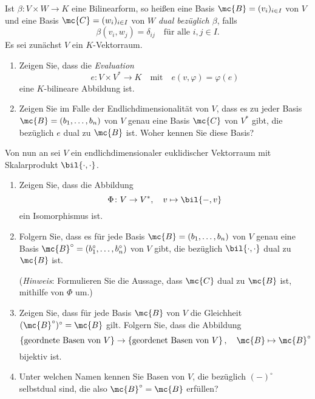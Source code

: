 \begin{question}
  Ist $\beta \colon V \times W \to K$ eine Bilinearform, so heißen eine Basis $\mc{B} = (v_i)_{i \in I}$ von $V$ und eine Basis $\mc{C} = (w_i)_{i \in I}$ von $W$ \emph{dual bezüglich $\beta$}, falls
  \[
    \beta(v_i, w_j) = \delta_{ij}
    \quad
    \text{für alle $i, j \in I$}.
  \]
  Es sei zunächst $V$ ein $K$-Vektorraum.
  \begin{enumerate}
    \item
      Zeigen Sie, dass die \emph{Evaluation}
      \[
        e \colon V \times V^* \to K
        \quad\text{mit}\quad
        e(v, \varphi) = \varphi(e)
      \]
      eine $K$-bilineare Abbildung ist.
    \item
      Zeigen Sie im Falle der Endlichdimensionalität von $V$, dass es zu jeder Basis $\mc{B} = (b_1, \dotsc, b_n)$ von $V$ genau eine Basis $\mc{C}$ von $V^*$ gibt, die bezüglich $e$ dual zu $\mc{B}$ ist.
      Woher kennen Sie diese Basis?
  \end{enumerate}
  Von nun an sei $V$ ein endlichdimensionaler euklidischer Vektorraum mit Skalarprodukt $\bil{\cdot, \cdot}$.
  \begin{enumerate}[resume]
    \item
      Zeigen Sie, dass die Abbildung
      \[
        \Phi \colon V \to V^*,
        \quad
        v \mapsto \bil{-, v}
      \]
      ein Isomorphismus ist.
    \item
      Folgern Sie, dass es für jede Basis $\mc{B} = (b_1, \dotsc, b_n)$ von $V$ genau eine Basis $\mc{B}^\circ = (b_1^\circ, \dotsc, b_n^\circ)$ von $V$ gibt, die bezüglich $\bil{\cdot, \cdot}$ dual zu $\mc{B}$ ist.
      
      (\emph{Hinweis}:
       Formulieren Sie die Aussage, dass $\mc{C}$ dual zu $\mc{B}$ ist, mithilfe von $\Phi$ um.)
    \item
      Zeigen Sie, dass für jede Basis $\mc{B}$ von $V$ die Gleichheit $(\mc{B}^\circ)^\circ = \mc{B}$ gilt.
      Folgern Sie, dass die Abbildung
      \[
            \left\{ \text{geordnete Basen von $V$} \right\}
        \to \left\{ \text{geordenet Basen von $V$} \right\},
        \quad
        \mc{B} \mapsto \mc{B}^\circ
      \]
      bijektiv ist.
    \item
      Unter welchen Namen kennen Sie Basen von $V$, die bezüglich $(-)^\circ$ selbstdual sind, die also $\mc{B}^\circ = \mc{B}$ erfüllen?
  \end{enumerate}
\end{question}


